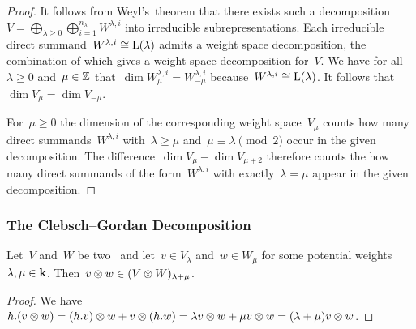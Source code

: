 \begin{proof}
  It follows from Weyl’s~theorem that there exists such a decomposition~$V = \bigoplus_{\lambda \geq 0} \bigoplus_{i=1}^{n_\lambda} W^{\lambda,i}$ into irreducible subrepresentations.
  Each irreducible direct summand~$W^{\lambda,i} \cong \operatorname{L}(\lambda)$ admits a weight space decomposition, the combination of which gives a weight space decomposition for~$V$.
  We have for all~$\lambda \geq 0$ and~$\mu \in \mathbb{Z}$ that~$\dim W^{\lambda,i}_\mu = W^{\lambda,i}_{-\mu}$ because~$W^{\lambda,i} \cong \operatorname{L}(\lambda)$.
  It follows that~$\dim V_\mu = \dim V_{-\mu}$.
  
  For~$\mu \geq 0$ the dimension of the corresponding weight space~$V_\mu$ counts how many direct summands~$W^{\lambda,i}$ with~$\lambda \geq \mu$ and~$\mu \equiv \lambda \pmod{2}$ occur in the given decomposition.
  The difference~$\dim V_\mu - \dim V_{\mu + 2}$ therefore counts the how many direct summands of the form~$W^{\lambda,i}$ with exactly~$\lambda = \mu$ appear in the given decomposition.
\end{proof}



\subsubsection{The Clebsch--Gordan Decomposition}


\begin{lemma}
  \label{tensor of sl2 weights}
  Let~$V$ and~$W$ be two~{} and let~$v \in V_\lambda$ and~$w \in W_\mu$ for some potential weights~$\lambda, \mu \in \mathbf{k}$.
  Then~$v \otimes w \in (V \otimes W)_{\lambda + \mu}$.
\end{lemma}


\begin{proof}
  We have~$h.(v \otimes w) = (h.v) \otimes w + v \otimes (h.w) = \lambda v \otimes w + \mu v \otimes w = (\lambda + \mu) v \otimes w$.
\end{proof}


